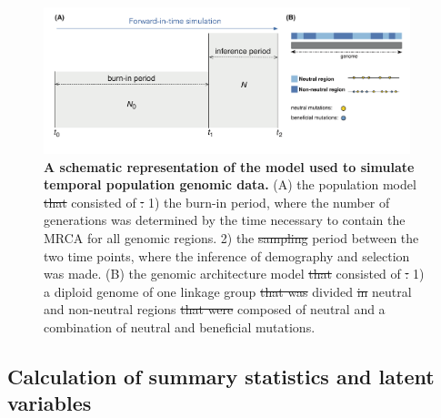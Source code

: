\documentclass[a4paper, 12pt]{article}
\providecommand{\DIFaddtex}[1]{{\protect\color{blue}\uwave{#1}}} %
\providecommand{\DIFdeltex}[1]{{\protect\color{red}\sout{#1}}}                      %
\providecommand{\DIFaddFL}[1]{\DIFadd{#1}} %
\providecommand{\DIFdelFL}[1]{\DIFdel{#1}} %
\providecommand{\DIFaddbeginFL}{} %
\providecommand{\DIFaddendFL}{} %
\providecommand{\DIFdelbeginFL}{} %
\providecommand{\DIFdelendFL}{} %
\providecommand{\DIFadd}[1]{\texorpdfstring{\DIFaddtex{#1}}{#1}} %
\providecommand{\DIFdel}[1]{\texorpdfstring{\DIFdeltex{#1}}{}} %
\newcommand{\DIFscaledelfig}{0.5}
\newlength{\DIFdelgraphicswidth} %
\newlength{\DIFdelgraphicsheight} %
\newcommand{\DIFaddincludegraphics}[2][]{{\color{blue}\fbox{\DIFOincludegraphics[#1]{#2}}}} %
\newcommand{\DIFdelincludegraphics}[2][]{%
\sbox{\DIFdelgraphicsbox}{\DIFOincludegraphics[#1]{#2}}%
\settoboxwidth{\DIFdelgraphicswidth}{\DIFdelgraphicsbox} %
\settoboxtotalheight{\DIFdelgraphicsheight}{\DIFdelgraphicsbox} %
\scalebox{\DIFscaledelfig}{%
\parbox[b]{\DIFdelgraphicswidth}{\usebox{\DIFdelgraphicsbox}\\[-\baselineskip] \rule{\DIFdelgraphicswidth}{0em}}\llap{\resizebox{\DIFdelgraphicswidth}{\DIFdelgraphicsheight}{%
\setlength{\unitlength}{\DIFdelgraphicswidth}%
\begin{picture}(1,1)%
\thicklines\linethickness{2pt} %
{\color[rgb]{1,0,0}\put(0,0){\framebox(1,1){}}}%
{\color[rgb]{1,0,0}\put(0,0){\line( 1,1){1}}}%
{\color[rgb]{1,0,0}\put(0,1){\line(1,-1){1}}}%
\end{picture}%
}\hspace*{3pt}}} %
} %
\DeclareRobustCommand{\DIFaddbeginFL}{\DIFOaddbeginFL \let\includegraphics\DIFaddincludegraphics} %
\DeclareRobustCommand{\DIFaddendFL}{\DIFOaddendFL \let\includegraphics\DIFOincludegraphics} %
\DeclareRobustCommand{\DIFdelbeginFL}{\DIFOdelbeginFL \let\includegraphics\DIFdelincludegraphics} %
\DeclareRobustCommand{\DIFdelendFL}{\DIFOaddendFL \let\includegraphics\DIFOincludegraphics} %
\begin{document}
\begin{figure}[ht]
 \centering
 \DIFdelbeginFL %
\DIFdelendFL \DIFaddbeginFL \includegraphics[width=0.95\textwidth]{Figures/Figure1_model.pdf}
 \DIFaddendFL \small\caption{\textbf{A schematic representation of the model used to simulate temporal population genomic data.} (A) the population model \DIFdelbeginFL \DIFdelFL{that }\DIFdelendFL consisted of \DIFdelbeginFL \DIFdelFL{: }\DIFdelendFL 1) the burn-in period, where the number of generations was determined by the time necessary to contain the MRCA for all genomic regions. 2) the \DIFdelbeginFL \DIFdelFL{sampling }\DIFdelendFL \DIFaddbeginFL \DIFaddFL{inference }\DIFaddendFL period between the two time points, where the inference of demography and selection was made. (B) the genomic architecture model \DIFdelbeginFL \DIFdelFL{that }\DIFdelendFL consisted of \DIFdelbeginFL \DIFdelFL{: }\DIFdelendFL 1) a diploid genome of one linkage group \DIFdelbeginFL \DIFdelFL{that was }\DIFdelendFL divided \DIFdelbeginFL \DIFdelFL{in }\DIFdelendFL \DIFaddbeginFL \DIFaddFL{into }\DIFaddendFL neutral and non-neutral regions \DIFdelbeginFL \DIFdelFL{that were }\DIFdelendFL composed of neutral and a combination of neutral and beneficial mutations.}\label{fig:model}
\end{figure}

\subsection*{Calculation of summary statistics and latent variables}
\end{document}
